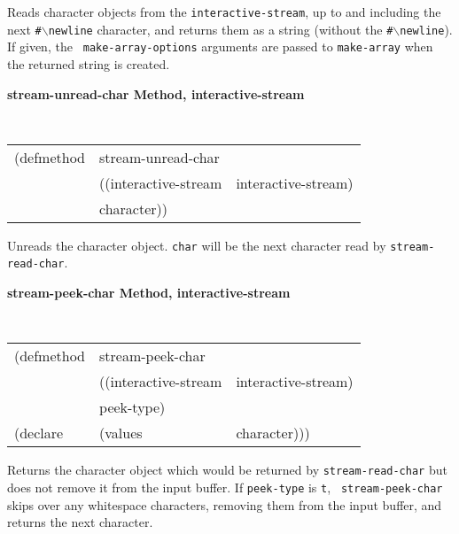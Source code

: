 \documentclass[twoside]{book}
\begin{document}
\begin{sloppy}
{\begin{flushright}
{}\end{flushright}}

\begin{flushright} \parbox[t]{6.125in}{
Reads character objects from the {\tt interactive-stream}, up to and including the
next {\tt \#$\backslash$newline} character, and returns them as a string
(without the {\tt \#$\backslash$newline}). If given, the {\tt
make-array-options} arguments are passed to {\tt make-array} when
the returned string is created.

}\end{flushright}


{\samepage
{\large {\bf stream-unread-char \hfill Method, interactive-stream}}
\begin{flushright} \parbox[t]{6.125in}{
\tt
\begin{tabular}{lll}
\raggedright
(defmethod & stream-unread-char & \\
& ((interactive-stream  &interactive-stream)\\
& character))
\end{tabular}
\rm

}\end{flushright}}

\begin{flushright} \parbox[t]{6.125in}{
Unreads the character object. {\tt char} will be the next character read by
{\tt stream-read-char}.

}\end{flushright}


{\samepage
{\large {\bf stream-peek-char \hfill Method, interactive-stream}}
\begin{flushright} \parbox[t]{6.125in}{
\tt
\begin{tabular}{lll}
\raggedright
(defmethod & stream-peek-char & \\
& ((interactive-stream  &interactive-stream)\\
& peek-type)\\
(declare &(values &character)))
\end{tabular}
\rm

}\end{flushright}}

\begin{flushright} \parbox[t]{6.125in}{
Returns the character object which would be returned by {\tt stream-read-char} but does
not remove it from the input buffer. If {\tt peek-type} is {\tt t}, {\tt
stream-peek-char} skips over any whitespace characters, removing them from the
input buffer, and returns the next character.

}
\end{flushright}
\end{sloppy}
\end{document}
